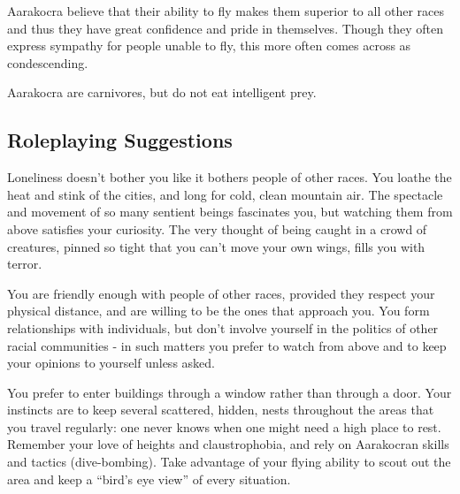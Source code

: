 Aarakocra believe that their ability to fly makes them superior to all other races and thus they have great confidence and pride in themselves. Though they often express sympathy for people unable to fly, this more often comes across as condescending.

Aarakocra are carnivores, but do not eat intelligent prey.

\subsection{Roleplaying Suggestions}
Loneliness doesn't bother you like it bothers people of other races. You loathe the heat and stink of the cities, and long for cold, clean mountain air. The spectacle and movement of so many sentient beings fascinates you, but watching them from above satisfies your curiosity. The very thought of being caught in a crowd of creatures, pinned so tight that you can't move your own wings, fills you with terror.

You are friendly enough with people of other races, provided they respect your physical distance, and are willing to be the ones that approach you. You form relationships with individuals, but don't involve yourself in the politics of other racial communities - in such matters you prefer to watch from above and to keep your opinions to yourself unless asked.

You prefer to enter buildings through a window rather than through a door. Your instincts are to keep several scattered, hidden, nests throughout the areas that you travel regularly: one never knows when one might need a high place to rest. Remember your love of heights and claustrophobia, and rely on Aarakocran skills and tactics (dive-bombing). Take advantage of your flying ability to scout out the area and keep a ``bird's eye view'' of every situation.

